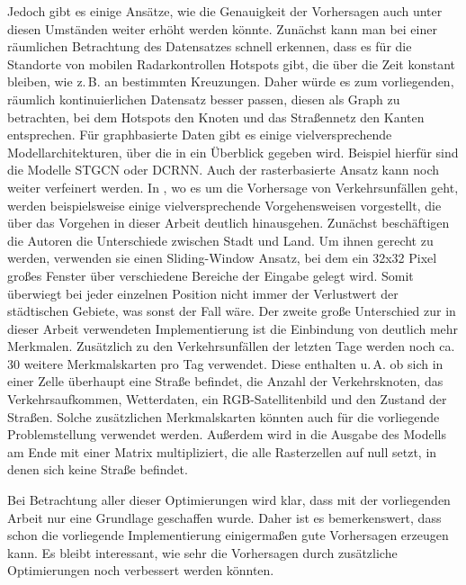 Jedoch gibt es einige Ansätze, wie die Genauigkeit der Vorhersagen auch unter diesen Umständen weiter erhöht werden könnte.
Zunächst kann man bei einer räumlichen Betrachtung des Datensatzes schnell erkennen, dass es für die Standorte von mobilen Radarkontrollen Hotspots gibt, die über die Zeit konstant bleiben, wie z.\,B. an bestimmten Kreuzungen.
Daher würde es zum vorliegenden, räumlich kontinuierlichen Datensatz besser passen, diesen als Graph zu betrachten, bei dem Hotspots den Knoten und das Straßennetz den Kanten entsprechen.
Für graphbasierte Daten gibt es einige vielversprechende Modellarchitekturen, über die in \cite{DLTraff} ein Überblick gegeben wird.
Beispiel hierfür sind die Modelle STGCN oder DCRNN.
Auch der rasterbasierte Ansatz kann noch weiter verfeinert werden.
In \cite{HeteroConvLSTM}, wo es um die Vorhersage von Verkehrsunfällen geht, werden beispielsweise einige vielversprechende Vorgehensweisen vorgestellt, die über das Vorgehen in dieser Arbeit deutlich hinausgehen.
Zunächst beschäftigen die Autoren die Unterschiede zwischen Stadt und Land.
Um ihnen gerecht zu werden, verwenden sie einen Sliding-Window Ansatz, bei dem ein 32x32 Pixel großes Fenster über verschiedene Bereiche der Eingabe gelegt wird.
Somit überwiegt bei jeder einzelnen Position nicht immer der Verlustwert der städtischen Gebiete, was sonst der Fall wäre.
Der zweite große Unterschied zur in dieser Arbeit verwendeten Implementierung ist die Einbindung von deutlich mehr Merkmalen.
Zusätzlich zu den Verkehrsunfällen der letzten Tage werden noch ca. 30 weitere Merkmalskarten pro Tag verwendet.
Diese enthalten u.\,A. ob sich in einer Zelle überhaupt eine Straße befindet, die Anzahl der Verkehrsknoten, das Verkehrsaufkommen, Wetterdaten, ein RGB-Satellitenbild und den Zustand der Straßen.
Solche zusätzlichen Merkmalskarten könnten auch für die vorliegende Problemstellung verwendet werden.
Außerdem wird in \cite{HeteroConvLSTM} die Ausgabe des Modells am Ende mit einer Matrix multipliziert, die alle Rasterzellen auf null setzt, in denen sich keine Straße befindet.

Bei Betrachtung aller dieser Optimierungen wird klar, dass mit der vorliegenden Arbeit nur eine Grundlage geschaffen wurde.
Daher ist es bemerkenswert, dass schon die vorliegende Implementierung einigermaßen gute Vorhersagen erzeugen kann.
Es bleibt interessant, wie sehr die Vorhersagen durch zusätzliche Optimierungen noch verbessert werden könnten.
